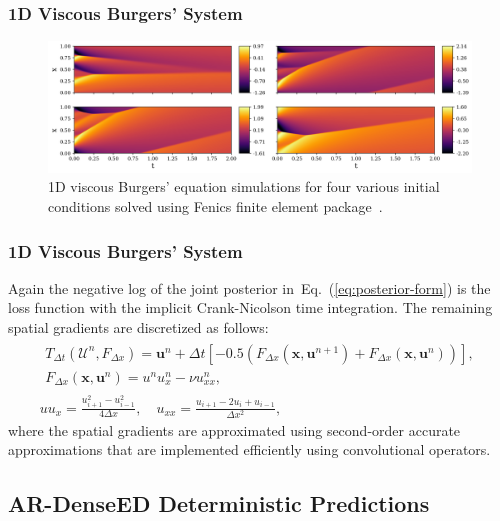 \documentclass{beamer}
\theoremstyle{remark}
\newcommand{\viscosity}{\nu}
\def\Eqref#1{Eq.~(\ref{#1})}
\begin{document}
\begin{frame}
\frametitle{1D Viscous Burgers' System}
\begin{figure}[H]
    \centering
    \includegraphics[width=\textwidth]{Fig09.png}
    \caption{1D viscous Burgers' equation simulations for four various initial conditions solved using Fenics finite element package~\cite{alnaes2015fenics}.}
    \label{fig:burgers1D-FEM}
\end{figure}
\end{frame}

\begin{frame}
\frametitle{1D Viscous Burgers' System}
Again the negative log of the joint posterior in~\Eqref{eq:posterior-form} is the loss function with the implicit Crank-Nicolson time integration.
The remaining spatial gradients are discretized as follows:
\begin{gather}
    \begin{gathered}T_{\Delta t}(\bm{\mathcal{U}}^{n}, F_{\Delta x}) = \bm{u}^{n} + \Delta t \left[-0.5\left(F_{\Delta x}(\bm{x}, \bm{u}^{n+1}) + F_{\Delta x}(\bm{x}, \bm{u}^{n})\right)\right],\\
    F_{\Delta x}(\bm{x}, \bm{u}^{n}) = u^{n}u^{n}_{x} - \viscosity u^{n}_{xx},\end{gathered}\\
    uu_{x} = \frac{u^{2}_{i+1} - u^{2}_{i-1}}{4\Delta x}, \quad u_{xx} = \frac{u_{i+1} - 2u_{i} + u_{i-1}}{\Delta x^{2}},
\end{gather}
where the spatial gradients are approximated using second-order accurate approximations that are implemented efficiently using convolutional operators.
\end{frame}

\subsection{AR-DenseED Deterministic Predictions}
\end{document}
